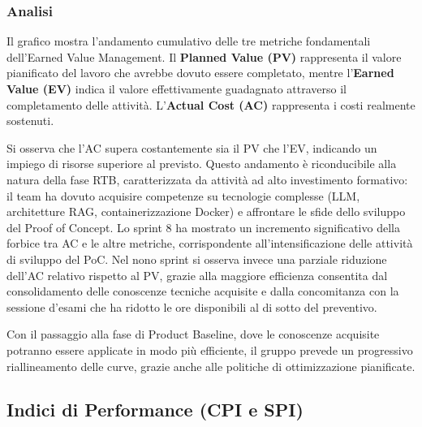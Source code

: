 \documentclass[a4paper,11pt,oneside]{scrartcl}
\begin{document}
\subsubsection*{Analisi}

Il grafico mostra l'andamento cumulativo delle tre metriche fondamentali dell'Earned Value Management. Il \textbf{Planned Value (PV)} rappresenta il valore pianificato del lavoro che avrebbe dovuto essere completato, mentre l'\textbf{Earned Value (EV)} indica il valore effettivamente guadagnato attraverso il completamento delle attività. L'\textbf{Actual Cost (AC)} rappresenta i costi realmente sostenuti.

Si osserva che l'AC supera costantemente sia il PV che l'EV, indicando un impiego di risorse superiore al previsto. Questo andamento è riconducibile alla natura della fase RTB, caratterizzata da attività ad alto investimento formativo: il team ha dovuto acquisire competenze su tecnologie complesse (LLM, architetture RAG, containerizzazione Docker) e affrontare le sfide dello sviluppo del Proof of Concept. Lo sprint 8 ha mostrato un incremento significativo della forbice tra AC e le altre metriche, corrispondente all'intensificazione delle attività di sviluppo del PoC. Nel nono sprint si osserva invece una parziale riduzione dell'AC relativo rispetto al PV, grazie alla maggiore efficienza consentita dal consolidamento delle conoscenze tecniche acquisite e dalla concomitanza con la sessione d'esami che ha ridotto le ore disponibili al di sotto del preventivo.

Con il passaggio alla fase di Product Baseline, dove le conoscenze acquisite potranno essere applicate in modo più efficiente, il gruppo prevede un progressivo riallineamento delle curve, grazie anche alle politiche di ottimizzazione pianificate.

\subsection{Indici di Performance (CPI e SPI)}
\end{document}

